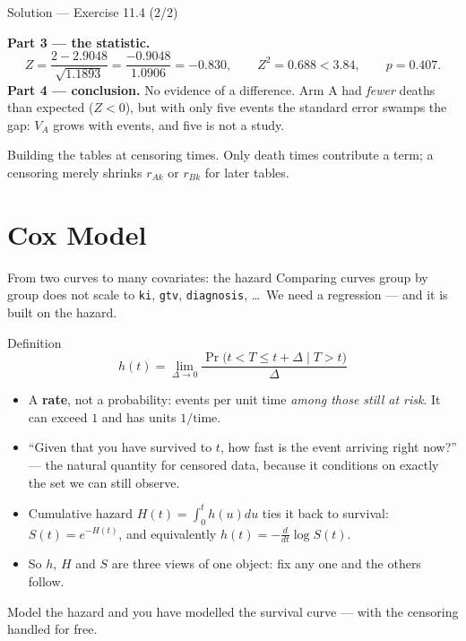 \documentclass[aspectratio=169,11pt]{beamer}
\begin{document}
\begin{frame}{Solution --- Exercise 11.4 (2/2)}
\begin{solutionbox}
  \medskip
  \textbf{Part 3 --- the statistic.}
  \[
    Z=\frac{2-2.9048}{\sqrt{1.1893}}=\frac{-0.9048}{1.0906}=-0.830,
    \qquad Z^2=0.688 < 3.84,\qquad p=0.407 .
  \]
  \textbf{Part 4 --- conclusion.} No evidence of a difference. Arm A had \emph{fewer}
  deaths than expected ($Z<0$), but with only five events the standard error swamps the
  gap: $V_A$ grows with events, and five is not a study.
\end{solutionbox}
\begin{mistake}
  \scriptsize
  Building the tables at censoring times. Only death times contribute a term; a censoring
  merely shrinks $r_{Ak}$ or $r_{Bk}$ for later tables.
\end{mistake}
\end{frame}

\section{Cox Model}

\begin{frame}{From two curves to many covariates: the hazard}
  \scriptsize
  Comparing curves group by group does not scale to \texttt{ki}, \texttt{gtv},
  \texttt{diagnosis}, \dots\ We need a regression --- and it is built on the hazard.
  \begin{block}{Definition}
    \[
      \boxed{\;h(t)=\lim_{\Delta\to 0}
        \frac{\Pr\bigl(t< T\le t+\Delta \mid T>t\bigr)}{\Delta}\;}
    \]
  \end{block}
  \begin{readme}
    \begin{itemize}
      \item A \textbf{rate}, not a probability: events per unit time \emph{among those
            still at risk}. It can exceed $1$ and has units $1/\text{time}$.
      \item ``Given that you have survived to $t$, how fast is the event arriving right
            now?'' --- the natural quantity for censored data, because it conditions on
            exactly the set we can still observe.
      \item Cumulative hazard $H(t)=\int_0^t h(u)du$ ties it back to survival:
            $S(t)=e^{-H(t)}$, and equivalently $h(t)=-\frac{d}{dt}\log S(t)$.
      \item So $h$, $H$ and $S$ are three views of one object: fix any one and the others
            follow.
    \end{itemize}
  \end{readme}
  \begin{takeaway}
    Model the hazard and you have modelled the survival curve --- with the censoring
    handled for free.
  \end{takeaway}
\end{frame}
\end{document}
